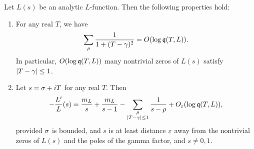     \begin{lemma}\label{lem:powerful_L-function_approximation_lemma}
      Let \(L(s)\) be an analytic \(L\)-function. Then the following properties hold:
      \begin{enumerate}[label*=(\roman*)]
        \item For any real \(T\), we have
        \[
          \sum_{\rho}\frac{1}{1+(T-\gamma)^{2}} = O(\log{\mathfrak{q}(T,L)}).
        \]
        In particular, \(O(\log{\mathfrak{q}(T,L)})\) many nontrivial zeros of \(L(s)\) satisfy \(|T-\gamma| \le 1\).
        \item Let \(s = \sigma+iT\) for any real \(T\). Then
        \[
          -\frac{L'}{L}(s) = \frac{m_{L}}{s}+\frac{m_{L}}{s-1}-\sum_{\substack{\rho \\ |T-\gamma| \le 1}}\frac{1}{s-\rho}+O_{\varepsilon}(\log{\mathfrak{q}(T,L)}),
        \]
        provided \(\sigma\) is bounded, and \(s\) is at least distance \(\varepsilon\) away from the nontrivial zeros of \(L(s)\) and the poles of the gamma factor, and \(s \neq 0,1\).
      \end{enumerate}
    \end{lemma}

